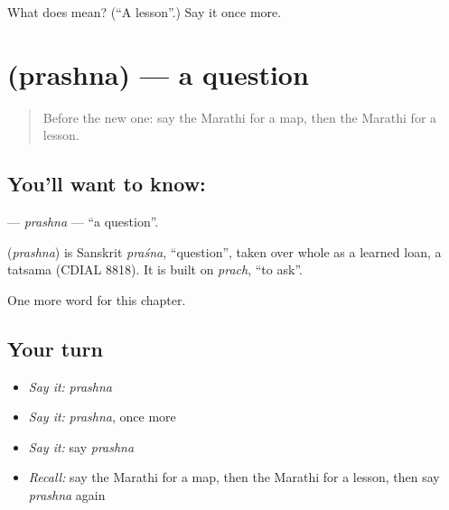 \begin{tcolorbox}[breakable,colback=teal!4,colframe=teal!35!black,title={Before you move on}]
What does  mean? (\textquotedblleft{}A lesson\textquotedblright{}.) Say it once more.
\end{tcolorbox}
\section[\texorpdfstring{\mr{प्रश्न} (prashna)}{प्रश्न (prashna)}]{ (prashna) — a question}

\label{lesson:MR-C94-prashna}



\begin{quote}
Before the new one: say the Marathi for a map, then the Marathi for a lesson.
\end{quote}

\subsection*{You'll want to know: }
\textbf{} — \emph{prashna} — \textquotedblleft{}a question\textquotedblright{}.

\begin{cousinweb}
\textbf{} (\emph{prashna}) is Sanskrit \emph{praśna}, \textquotedblleft{}question\textquotedblright{}, taken over whole as a learned loan, a tatsama (CDIAL 8818). It is built on \emph{prach}, \textquotedblleft{}to ask\textquotedblright{}.
\end{cousinweb}

\begin{grammarlens}[title={What you've built}]
One more word for this chapter.
\end{grammarlens}

\subsection*{Your turn}
\begin{itemize}
\raggedright
  \item \emph{Say it:} \emph{prashna}
  \item \emph{Say it:} \emph{prashna}, once more
  \item \emph{Say it:} say \emph{prashna}
  \item \emph{Recall:} say the Marathi for a map, then the Marathi for a lesson, then say \emph{prashna} again
\end{itemize}

